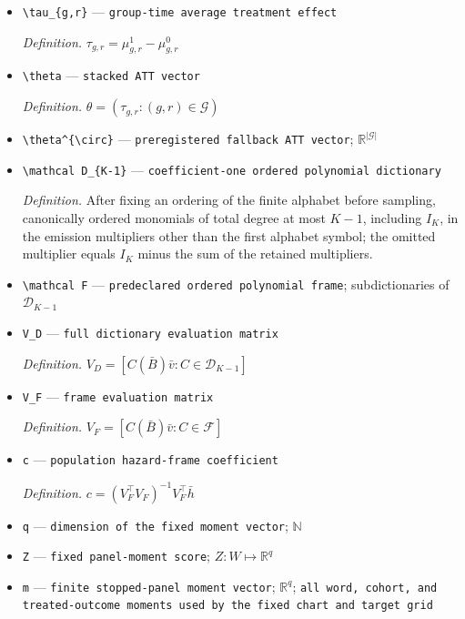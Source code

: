 \documentclass{article}
\begin{document}
\begin{itemize}
  \item \texttt{\textbackslash{}\allowbreak{}tau\_\allowbreak{}\{g,\allowbreak{}r\}\allowbreak{}} --- \texttt{group-\allowbreak{}time average treatment effect}
  \par\smallskip\noindent\emph{Definition.} \(\tau_{g,r}=\mu^1_{g,r}-\mu^0_{g,r}\)
  \item \texttt{\textbackslash{}\allowbreak{}theta} --- \texttt{stacked ATT vector}
  \par\smallskip\noindent\emph{Definition.} \(\theta=(\tau_{g,r}:(g,r)\in\mathcal G)\)
  \item \texttt{\textbackslash{}\allowbreak{}theta\textasciicircum{}\{\textbackslash{}\allowbreak{}circ\}\allowbreak{}} --- \texttt{preregistered fallback ATT vector}; \(\mathbb R^{|\mathcal G|}\)
  \item \texttt{\textbackslash{}\allowbreak{}mathcal D\_\allowbreak{}\{K-\allowbreak{}1\}\allowbreak{}} --- \texttt{coefficient-\allowbreak{}one ordered polynomial dictionary}
  \par\smallskip\noindent\emph{Definition.} After fixing an ordering of the finite alphabet before sampling, canonically ordered monomials of total degree at most \(K-1\), including \(I_K\), in the emission multipliers other than the first alphabet symbol; the omitted multiplier equals \(I_K\) minus the sum of the retained multipliers.
  \item \texttt{\textbackslash{}\allowbreak{}mathcal F} --- \texttt{predeclared ordered polynomial frame}; subdictionaries of \(\mathcal D_{K-1}\)
  \item \texttt{V\_\allowbreak{}D} --- \texttt{full dictionary evaluation matrix}
  \par\smallskip\noindent\emph{Definition.} \(V_D=[C(\bar B)\bar v:C\in\mathcal D_{K-1}]\)
  \item \texttt{V\_\allowbreak{}F} --- \texttt{frame evaluation matrix}
  \par\smallskip\noindent\emph{Definition.} \(V_F=[C(\bar B)\bar v:C\in\mathcal F]\)
  \item \texttt{c} --- \texttt{population hazard-\allowbreak{}frame coefficient}
  \par\smallskip\noindent\emph{Definition.} \(c=(V_F^{\top}V_F)^{-1}V_F^{\top}\bar h\)
  \item \texttt{q} --- \texttt{dimension of the fixed moment vector}; \(\mathbb N\)
  \item \texttt{Z} --- \texttt{fixed panel-\allowbreak{}moment score}; \(Z:W\mapsto\mathbb R^q\)
  \item \texttt{m} --- \texttt{finite stopped-\allowbreak{}panel moment vector}; \(\mathbb R^q\); \texttt{all word,\allowbreak{} cohort,\allowbreak{} and treated-\allowbreak{}outcome moments used by the fixed chart and target grid}

\end{itemize}
\end{document}
